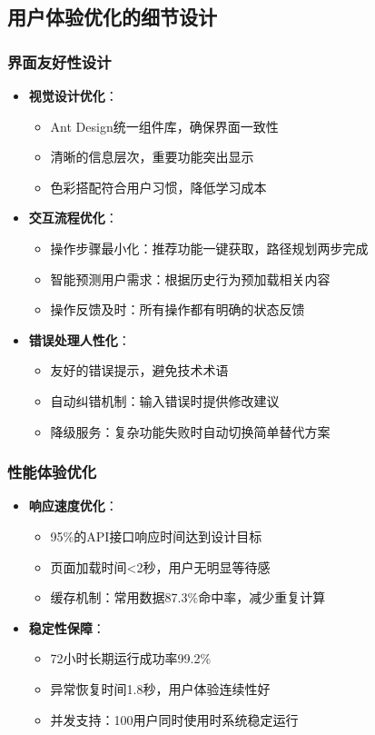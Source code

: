 \documentclass[12pt,a4paper]{article}
\begin{document}
\subsection{用户体验优化的细节设计}
\subsubsection{界面友好性设计}
\begin{itemize}
    \item \textbf{视觉设计优化}：
    \begin{itemize}
        \item Ant Design统一组件库，确保界面一致性
        \item 清晰的信息层次，重要功能突出显示
        \item 色彩搭配符合用户习惯，降低学习成本
    \end{itemize}
    \item \textbf{交互流程优化}：
    \begin{itemize}
        \item 操作步骤最小化：推荐功能一键获取，路径规划两步完成
        \item 智能预测用户需求：根据历史行为预加载相关内容
        \item 操作反馈及时：所有操作都有明确的状态反馈
    \end{itemize}
    \item \textbf{错误处理人性化}：
    \begin{itemize}
        \item 友好的错误提示，避免技术术语
        \item 自动纠错机制：输入错误时提供修改建议
        \item 降级服务：复杂功能失败时自动切换简单替代方案
    \end{itemize}
\end{itemize}

\subsubsection{性能体验优化}
\begin{itemize}
    \item \textbf{响应速度优化}：
    \begin{itemize}
        \item 95\%的API接口响应时间达到设计目标
        \item 页面加载时间<2秒，用户无明显等待感
        \item 缓存机制：常用数据87.3\%命中率，减少重复计算
    \end{itemize}
    \item \textbf{稳定性保障}：
    \begin{itemize}
        \item 72小时长期运行成功率99.2\%
        \item 异常恢复时间1.8秒，用户体验连续性好
        \item 并发支持：100用户同时使用时系统稳定运行
    \end{itemize}
\end{itemize}
\end{document}
